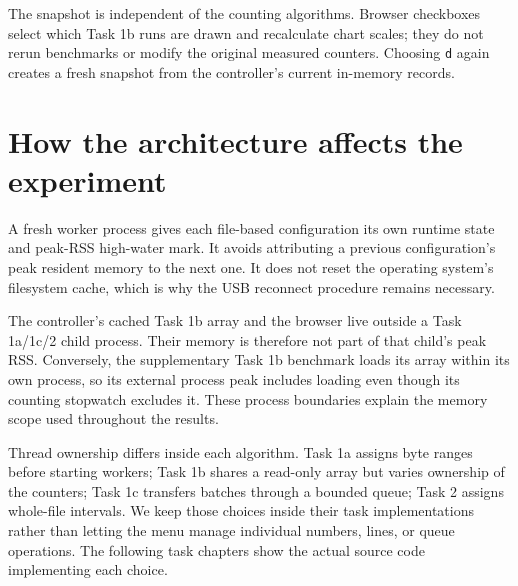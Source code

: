 The snapshot is independent of the counting algorithms. Browser checkboxes select which Task 1b runs are drawn and recalculate chart scales; they do not rerun benchmarks or modify the original measured counters. Choosing \texttt{d} again creates a fresh snapshot from the controller's current in-memory records.

\section{How the architecture affects the experiment}
A fresh worker process gives each file-based configuration its own runtime state and peak-RSS high-water mark. It avoids attributing a previous configuration's peak resident memory to the next one. It does not reset the operating system's filesystem cache, which is why the USB reconnect procedure remains necessary.

The controller's cached Task 1b array and the browser live outside a Task 1a/1c/2 child process. Their memory is therefore not part of that child's peak RSS. Conversely, the supplementary Task 1b benchmark loads its array within its own process, so its external process peak includes loading even though its counting stopwatch excludes it. These process boundaries explain the memory scope used throughout the results.

Thread ownership differs inside each algorithm. Task 1a assigns byte ranges before starting workers; Task 1b shares a read-only array but varies ownership of the counters; Task 1c transfers batches through a bounded queue; Task 2 assigns whole-file intervals. We keep those choices inside their task implementations rather than letting the menu manage individual numbers, lines, or queue operations. The following task chapters show the actual source code implementing each choice.
